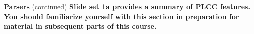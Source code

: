 \begin{minipage}[t]{\sw}
\slidenumber
\LARGE
{\bf Parsers} (continued)\exx
{\bf Slide set 1a provides a summary of PLCC features.
You should familiarize yourself with this section
in preparation for material in subsequent parts of this course.}
\end{minipage}
\clearpage
